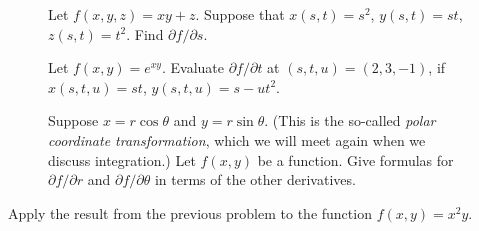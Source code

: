 \documentclass[12pt]{exam}
\theoremstyle{definition}
\begin{document}
\begin{questions}

\begin{figure}[ht]
\begin{minipage}[t]{0.7\linewidth}
\question Let $f(x, y, z) = xy + z$. Suppose that $x(s,t) = s^2$, $y(s,t) = st$, $z(s,t) = t^2$. Find $\partial f/\partial s$. 
\end{minipage} \hspace*{1cm}
\begin{minipage}[t]{0.25\linewidth}
\hfill
\end{minipage}
\end{figure}


\begin{figure}[ht]
\begin{minipage}[t]{0.7\linewidth}
\question Let $f(x,y) = e^{xy}$. Evaluate $\partial f / \partial t$ at $(s,t,u) = (2, 3, -1)$, if $x(s, t, u) = st$, $y(s, t, u) = s - ut^2$.
\end{minipage} \hspace*{1cm}
\begin{minipage}[t]{0.25\linewidth}
\hfill
\end{minipage}
\end{figure}


\newpage


\begin{figure}[ht]
\begin{minipage}[t]{0.7\linewidth}
\question Suppose $x = r \cos{\theta}$ and $y = r \sin{\theta}$. (This is the so-called \emph{polar coordinate transformation}, which we will meet again when we discuss integration.) Let $f(x,y)$ be a function. Give formulas for $\partial f / \partial r$ and $\partial f / \partial \theta$ in terms of the other derivatives.
\end{minipage} \hspace*{1cm}
\begin{minipage}[t]{0.25\linewidth}
\hfill
\end{minipage}
\end{figure}


\question Apply the result from the previous problem to the function $f(x, y) = x^2 y$.


\end{questions}
\end{document}

